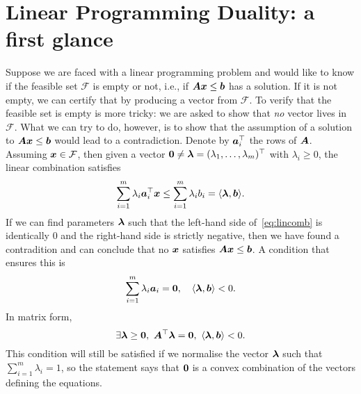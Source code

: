 \section{Linear Programming Duality: a first glance}
Suppose we are faced with a linear programming problem and would like to know if the feasible set $\mathcal{F}$ is empty or not, i.e., if $\bm{A}\bm{x}\leq \bm{b}$ has a solution. If it is not empty, we can certify that by producing a vector from $\mathcal{F}$. To verify that the feasible set is empty is more tricky: we are asked to show that {\em no} vector lives in $\mathcal{F}$. What we can try to do, however, is to show that the assumption of a solution to $\bm{A}\bm{x}\leq \bm{b}$ would lead to a contradiction.
Denote by $\bm{a}_i^{\top}$ the rows of $\bm{A}$. Assuming $\bm{x}\in \mathcal{F}$, then given a vector $\bm{0}\neq \bm{\lambda}=(\lambda_1,\dots,\lambda_m)^{\top}$ with $\lambda_i\geq 0$, the linear combination satisfies
\begin{equation}\label{eq:lincomb}
 \sum_{i=1}^m\lambda_i \bm{a}_i^{\top}\bm{x} \leq \sum_{i=1}^m \lambda_i b_i = \langle {\bm{\lambda}}, {\bm{b}} \rangle.
\end{equation}
If we can find parameters $\bm{\lambda}$ such that the left-hand side of~\eqref{eq:lincomb} is identically $0$ and the right-hand side is strictly negative, then we have found a contradition and can conclude that no $\bm{x}$ satisfies $\bm{A}\bm{x}\leq \bm{b}$. A condition that ensures this is
\begin{equation}\label{eq:dual}
 \sum_{i=1}^m \lambda_i\bm{a}_i = \bm{0}, \quad \langle {\bm{\lambda}}, {\bm{b}} \rangle < 0.
\end{equation}
In matrix form,
\begin{equation*}
 \exists \vct{\lambda}\geq \zerovct, \ \mtx{A}^{\trans}\vct{\lambda}=\zerovct, \ \ip{\vct{\lambda}}{\vct{b}}<0.
\end{equation*}
This condition will still be satisfied if we normalise the vector $\bm{\lambda}$ such that $\sum_{i=1}^m\lambda_i=1$, so the statement says that $\bm{0}$ is a convex combination of the vectors defining the equations.

